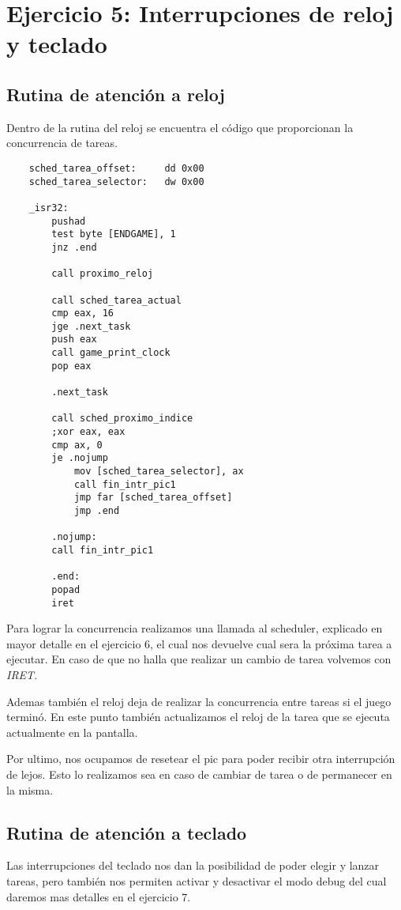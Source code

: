 \section{Ejercicio 5: Interrupciones de reloj y teclado}

	\subsection{Rutina de atención a reloj}
	Dentro de la rutina del reloj se encuentra el código que proporcionan la concurrencia de tareas.

	\begin{lstlisting}
	sched_tarea_offset:     dd 0x00
	sched_tarea_selector:   dw 0x00

	_isr32:
	    pushad
	    test byte [ENDGAME], 1
	    jnz .end

    	call proximo_reloj

	    call sched_tarea_actual
	    cmp eax, 16 
	    jge .next_task
	    push eax
	    call game_print_clock
	    pop eax

	    .next_task

	    call sched_proximo_indice 
	    ;xor eax, eax
	    cmp ax, 0
	    je .nojump
	        mov [sched_tarea_selector], ax
	        call fin_intr_pic1
	        jmp far [sched_tarea_offset]
	        jmp .end

	    .nojump:
	    call fin_intr_pic1

	    .end:
	    popad
	    iret
	\end{lstlisting}

	Para lograr la concurrencia realizamos una llamada al scheduler, explicado en mayor detalle en el ejercicio 6, el cual nos devuelve cual sera la próxima tarea a ejecutar. En caso de que no halla que realizar un cambio de tarea volvemos con \textit{IRET}. 

	Ademas también el reloj deja de realizar la concurrencia entre tareas si el juego terminó. En este punto también actualizamos el reloj de la tarea que se ejecuta actualmente en la pantalla. 

	Por ultimo, nos ocupamos de resetear el pic para poder recibir otra interrupción de lejos. Esto lo realizamos sea en caso de cambiar de tarea o de permanecer en la misma.

	\subsection{Rutina de atención a teclado}
	Las interrupciones del teclado nos dan la posibilidad de poder elegir y lanzar tareas, pero también nos permiten activar y desactivar el modo debug del cual daremos mas detalles en el ejercicio 7.

